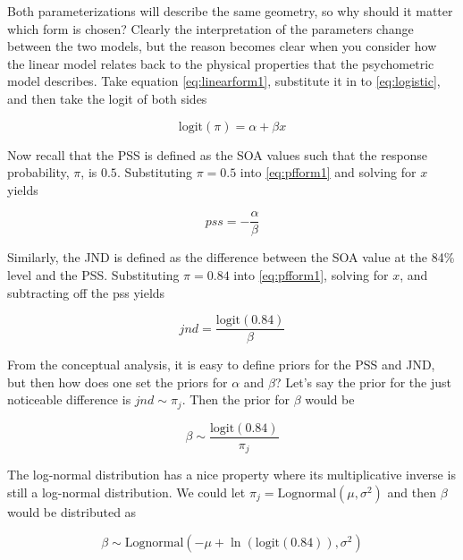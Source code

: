 \documentclass[11pt, oneside, openany]{scrbook}
\begin{document}
Both parameterizations will describe the same geometry, so why should it matter which form is chosen? Clearly the interpretation of the parameters change between the two models, but the reason becomes clear when you consider how the linear model relates back to the physical properties that the psychometric model describes. Take equation \eqref{eq:linearform1}, substitute it in to \eqref{eq:logistic}, and then take the logit of both sides


\begin{equation}
  \mathrm{logit}(\pi) = \alpha+\beta x
  \label{eq:pfform1}
\end{equation}

Now recall that the PSS is defined as the SOA values such that the response probability, \(\pi\), is \(0.5\). Substituting \(\pi = 0.5\) into \eqref{eq:pfform1} and solving for \(x\) yields


\[
pss = -\frac{\alpha}{\beta}
\]

Similarly, the JND is defined as the difference between the SOA value at the 84\% level and the PSS. Substituting \(\pi = 0.84\) into \eqref{eq:pfform1}, solving for \(x\), and subtracting off the pss yields


\begin{equation}
  jnd = \frac{\mathrm{logit}(0.84)}{\beta}
  \label{eq:jnd1}
\end{equation}

From the conceptual analysis, it is easy to define priors for the PSS and JND, but then how does one set the priors for \(\alpha\) and \(\beta\)? Let's say the prior for the just noticeable difference is \(jnd \sim \pi_j\). Then the prior for \(\beta\) would be


\[
\beta \sim \frac{\mathrm{logit}(0.84)}{\pi_j}
\]

The log-normal distribution has a nice property where its multiplicative inverse is still a log-normal distribution. We could let \(\pi_j = \mathrm{Lognormal}(\mu, \sigma^2)\) and then \(\beta\) would be distributed as


\[
\beta \sim \mathrm{Lognormal}(-\mu + \ln(\mathrm{logit}(0.84)), \sigma^2)
\]
\end{document}
